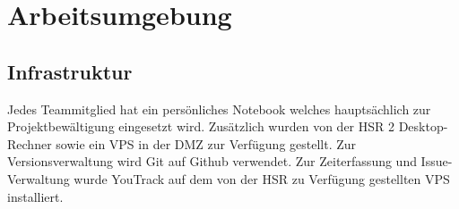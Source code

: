 \section{Arbeitsumgebung}
\label{sec:Arbeitsumgebung}

\subsection{Infrastruktur}
Jedes Teammitglied hat ein persönliches Notebook welches hauptsächlich zur Projektbewältigung eingesetzt wird. Zusätzlich wurden von der HSR 2 Desktop-Rechner sowie ein VPS in der DMZ zur Verfügung gestellt.
Zur Versionsverwaltung wird Git auf Github verwendet. Zur Zeiterfassung und Issue-Verwaltung wurde YouTrack auf dem von der HSR zu Verfügung gestellten VPS installiert.